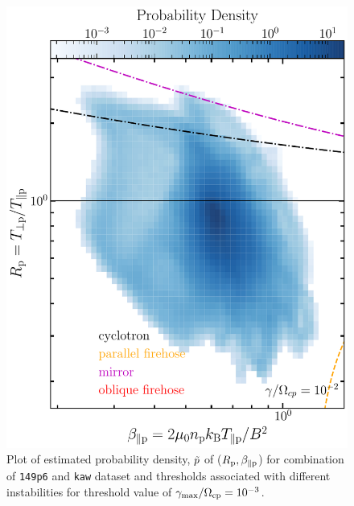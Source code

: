     \begin{figure}
        \begin{center}
            \includegraphics[width=1\textwidth]{figures/apdxA/brazil_prob_2d.pdf}
            \caption[Brazil-plot of \texttt{2dsim} dataset]{Plot of estimated probability density,
            $\Tilde{p}$ of ($R_{\rm p}, \beta_{\parallel \rm p}$) for combination of \texttt{149p6}
            and \texttt{kaw} dataset and thresholds associated with different instabilities for
            threshold value of $\gamma_{\max}/\Omega_{\rm cp} = 10^{-3}$.}
            \label{fig:brazil_prob_2d}
        \end{center}
    \end{figure}

